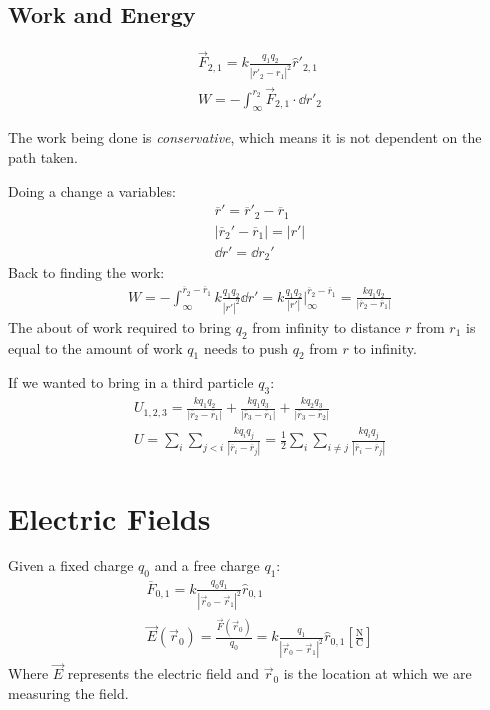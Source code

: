 \documentclass[00_complete]{subfiles}
\begin{document}
\subsection{Work and Energy}
\begin{gather*}
    \vec F_{2,1}=k\frac{q_1q_2}{|r'_2-r_1|^2}\hat r'_{2,1} \\
W = - \int_\infty^{r_2} \vec F_{2,1}\cdot \dd{r'_2}
\end{gather*}
\begin{note}
    The work being done is \emph{conservative}, which means it is not dependent
    on the path taken.
\end{note}
Doing a change a variables:
\begin{gather*}
    \overline r' = \overline r'_2 - \overline r_1 \\
    |\overline r_2' - \overline r_1| = |r'| \\
    \dd{r'}=\dd{r_2'}
\end{gather*}
Back to finding the work:
\begin{gather*}
    W = -\int_{\infty}^{\overline r_2 - \overline
    r_1}k\frac{q_1q_2}{|r'|^2}\dd{r'}  =
    k\frac{q_1q_2}{|r'|}\Bigr|_{\infty}^{\overline r_2-\overline r_1} =
    \frac{kq_1q_2}{|\overline r_2 - \overline r_1|}
\end{gather*}
The about of work required to bring $q_2$ from infinity to distance $r$ from
$r_1$ is equal to the amount of work $q_1$ needs to push $q_2$ from $r$ to
infinity.

If we wanted to bring in a third particle $q_3$:
\begin{gather*}
    U_{1,2,3}= \frac{kq_1q_2}{|\overline r_2 -\overline r_1|} +
    \frac{kq_1q_3}{|\overline r_3 - \overline r_1|} + \frac{kq_2q_3}{|\overline
    r_3 - \overline r_2|} \\
    U=\sum_{i}\sum_{j<i}\frac{kq_iq_j}{|\overline r_i-\overline r_j|} =
    \frac{1}{2}\sum_i\sum_{i \neq j}\frac{kq_iq_j}{|\overline r_i - \overline
    r_j|}
\end{gather*}
\section{Electric Fields}

Given a fixed charge $q_0$ and a free charge $q_1$:
\begin{gather*}
    \overline F_{0,1}=k\frac{q_0q_1}{|\vec r_0-\vec r_1|^2}\hat r_{0,1} \\
    \vec E(\vec r_0)=\frac{\vec F(\vec r_0)}{q_0}=k\frac{q_1}{|\vec r_0 - \vec
    r_1|^2}\hat r_{0,1} \left[\frac{\mathrm N}{\mathrm C}\right]
\end{gather*}
Where $\vec E$ represents the electric field and $\vec r_0$ is the location at
which we are measuring the field.
\end{document}
